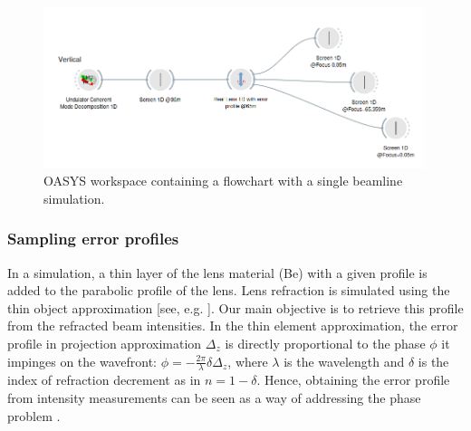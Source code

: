 \documentclass[preprint]{iucr}
\newcommand{\inred}[1]{{\color{red}#1}}
\begin{document}
\begin{figure}\label{fig:oasys}
    \includegraphics[width=0.99\textwidth]{figures/oasys.png}
    \caption{OASYS workspace containing a flowchart with a single beamline simulation. 
    }
\end{figure}

\subsubsection{Sampling error profiles}
In a simulation, a thin layer of the lens material (Be) with a given profile is added to the parabolic profile of the lens. Lens refraction is simulated using the thin object approximation \inred{[see, e.g. \cite{Celestre2020, multioptics}]}. Our main objective is to retrieve this profile from the refracted beam intensities. \inred{In the thin element approximation, the error profile in projection approximation $\Delta_z$ is directly proportional to the phase $\phi$ it impinges on the wavefront: $\phi = - \frac{2\pi}{\lambda} \delta \Delta_z$, where $\lambda$ is the wavelength and $\delta$ is the index of refraction decrement as in $n=1-\delta$. Hence, obtaining the error profile from intensity measurements can be seen as a way of addressing the phase problem \cite{Taylor1981, Klibanov1995}.}
\end{document}
